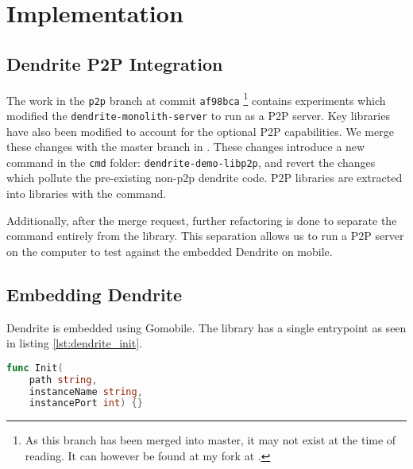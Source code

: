 \chapter{Implementation}



\section{Dendrite P2P Integration}
The work in the \texttt{p2p} branch at commit \texttt{af98bca}
\footnote{
    As this branch has been merged into master, it may not exist at the time of reading. It can however be found at my fork at .
}
contains experiments which modified the \texttt{dendrite-monolith-server} to run as a \ac{P2P} server.
Key libraries have also been modified to account for the optional \ac{P2P} capabilities.
We merge these changes with the master branch in .
These changes introduce a new command in the \texttt{cmd} folder: \texttt{dendrite-demo-libp2p}, and revert the changes which pollute the pre-existing non-p2p dendrite code.
\ac{P2P} libraries are extracted into libraries with the command.

Additionally, after the merge request, further refactoring is done to separate the command entirely from the library.
This separation allows us to run a P2P server on the computer to test against the embedded Dendrite on mobile.

\section{Embedding Dendrite}
Dendrite is embedded using Gomobile.
The library has a single entrypoint as seen in listing \ref{lst:dendrite_init}.
\begin{lstlisting}[language=Go, label={lst:dendrite_init}, caption={
    The Init function spawns a Dendrite server as a monolith.
    The monolith creates SQLite databases in the directory specified by \texttt{path}.
    The other two parameters are used to avoid namespace and port clashing.
    This is necessary for spawning more than one instance on the same host.
}]
func Init(
    path string, 
    instanceName string, 
    instancePort int) {}
\end{lstlisting}

